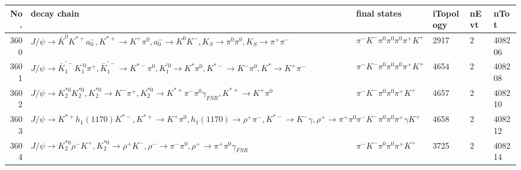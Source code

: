 \begin{table}[htbp] 
\begin{center}
\begin{small}
\begin{tabular}{rlllll}\hline\hline
 No. & decay chain & final states &  iTopology & nEvt & nTot \\\hline
3600&$J/\psi       \rightarrow \bar{K}^{0}   K^{*+}         a_{0}^{-}      , K^{*+}          \rightarrow K^{+}          \pi^{0}        , a_{0}^{-}       \rightarrow K^{0}          K^{-}          , K_{S}           \rightarrow \pi^{0}        \pi^{0}        , K_{S}           \rightarrow \pi^{+}        \pi^{-}        $&$\pi^{-}        K^{-}          \pi^{0}        \pi^{0}        \pi^{0}        \pi^{+}        K^{+}          $& 2917&    2&408206\\
3601&$J/\psi       \rightarrow \bar{K}_1^{'-}K_1^{'0}      \pi^{+}        , \bar{K}_1^{'-} \rightarrow K^{*-}         \pi^{0}        , K_1^{'0}       \rightarrow K^{*}          \pi^{0}        , K^{*-}          \rightarrow K^{-}          \pi^{0}        , K^{*}           \rightarrow K^{+}          \pi^{-}        $&$\pi^{-}        K^{-}          \pi^{0}        \pi^{0}        \pi^{0}        \pi^{+}        K^{+}          $& 4654&    2&408208\\
3602&$J/\psi       \rightarrow K_2^{*0}       K_2^{*0}       , K_2^{*0}        \rightarrow K^{-}          \pi^{+}        , K_2^{*0}        \rightarrow K^{*+}         \pi^{-}        \pi^{0}        \gamma_{FSR} , K^{*+}          \rightarrow K^{+}          \pi^{0}        $&$\pi^{-}        K^{-}          \pi^{0}        \pi^{0}        \pi^{+}        K^{+}          $& 4657&    2&408210\\
3603&$J/\psi       \rightarrow K^{*+}         h_{1}(1170)    K^{*-}         , K^{*+}          \rightarrow K^{+}          \pi^{0}        , h_{1}(1170)     \rightarrow \rho^{+}      \pi^{-}        , K^{*-}          \rightarrow K^{-}          \gamma       , \rho^{+}       \rightarrow \pi^{+}        \pi^{0}        $&$\pi^{-}        K^{-}          \pi^{0}        \pi^{0}        \pi^{+}        \gamma       K^{+}          $& 4658&    2&408212\\
3604&$J/\psi       \rightarrow K_2^{*0}       \rho^{-}      K^{+}          , K_2^{*0}        \rightarrow \rho^{+}      K^{-}          , \rho^{-}       \rightarrow \pi^{-}        \pi^{0}        , \rho^{+}       \rightarrow \pi^{+}        \pi^{0}        \gamma_{FSR} $&$\pi^{-}        K^{-}          \pi^{0}        \pi^{0}        \pi^{+}        K^{+}          $& 3725&    2&408214\\

\end{tabular}
\end{small}
\end{center}
\end{table}
